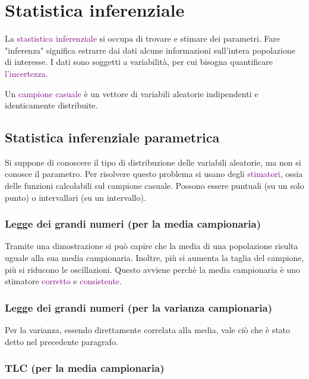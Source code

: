 \chapter{Statistica inferenziale}

La \textcolor{purple}{stastistica inferenziale} si occupa di trovare e stimare dei parametri. Fare "inferenza" significa estrarre dai dati alcune informazioni sull'intera popolazione di interesse. I dati sono soggetti a variabilità, per cui bisogna quantificare \textcolor{purple}{l'incertezza}.

Un \textcolor{purple}{campione casuale} è un vettore di variabili aleatorie indipendenti e identicamente distribuite. 

\section{Statistica inferenziale parametrica}

Si suppone di conoscere il tipo di distribuzione delle variabili aleatorie, ma non si conosce il parametro. Per risolvere questo problema si usano degli \textcolor{purple}{stimatori}, ossia delle funzioni calcolabili sul campione casuale. Possono essere puntuali (su un solo punto) o intervallari (su un intervallo).

\subsection{Legge dei grandi numeri (per la media campionaria)}

Tramite una dimostrazione si può capire che la media di una popolazione risulta uguale alla sua media campionaria. Inoltre, più si aumenta la taglia del campione, più si riducono le oscillazioni. Questo avviene perchè la media campionaria è uno stimatore \textcolor{purple}{corretto} e \textcolor{purple}{consistente}.

\subsection{Legge dei grandi numeri (per la varianza campionaria)}

Per la varianza, essendo direttamente correlata alla media, vale ciò che è stato detto nel precedente paragrafo.

\subsection{TLC (per la media campionaria)}

